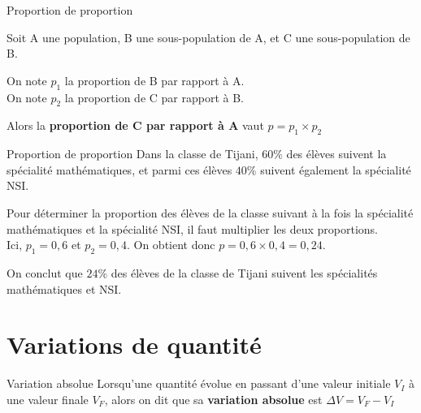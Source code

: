 \documentclass[oneside,12pt]{article}          %
\begin{document}
\begin{propriete}{Proportion de proportion}
	\begin{minipage}{0.5\textwidth} \restoreskip
		Soit A une population, B une sous-population de A, et C une sous-population de B.
		
		On note $p_1$ la proportion de B  par rapport à A.\\
		On note $p_2$ la proportion de C par rapport à B.
		
		Alors la \textbf{proportion de C par rapport à A} vaut $p = p_1 \times p_2$
	\end{minipage}
	\begin{minipage}{0.5\textwidth}
	\end{minipage}
\end{propriete}

\begin{exemple}{Proportion de proportion}
	Dans la classe de Tijani, $60\%$ des élèves suivent la spécialité mathématiques, et parmi ces élèves $40\%$ suivent également la spécialité NSI.
	
	Pour déterminer la proportion des élèves de la classe suivant à la fois la spécialité mathématiques et la spécialité NSI, il faut multiplier les deux proportions. \\
	Ici, $p_1 = 0,6$ et $p_2 = 0,4$. \quad On obtient donc $p = 0,6 \times 0,4 = 0,24$.
	
	On conclut que $24\%$ des élèves de la classe de Tijani suivent les spécialités mathématiques et NSI.
\end{exemple}



\section{Variations de quantité}

\begin{definition}{Variation absolue}
	Lorsqu'une quantité évolue en passant d'une valeur initiale $V_I$ à une valeur finale $V_F$, alors on dit que sa \textbf{variation absolue} est $\Delta V = V_F - V_I$
\end{definition}
\end{document}
